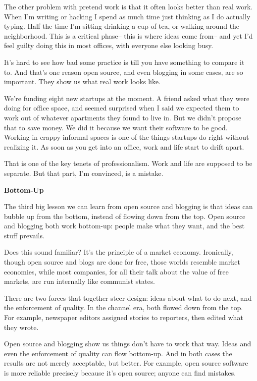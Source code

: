 The other problem with pretend work is that it often looks better than
real work. When I'm writing or hacking I spend as much time just
thinking as I do actually typing. Half the time I'm sitting drinking a
cup of tea, or walking around the neighborhood. This is a critical
phase-- this is where ideas come from-- and yet I'd feel guilty doing
this in most offices, with everyone else looking busy.

It's hard to see how bad some practice is till you have something to
compare it to. And that's one reason open source, and even blogging in
some cases, are so important. They show us what real work looks like.

We're funding eight new startups at the moment. A friend asked what they
were doing for office space, and seemed surprised when I said we
expected them to work out of whatever apartments they found to live in.
But we didn't propose that to save money. We did it because we want
their software to be good. Working in crappy informal spaces is one of
the things startups do right without realizing it. As soon as you get
into an office, work and life start to drift apart.

That is one of the key tenets of professionalism. Work and life are
supposed to be separate. But that part, I'm convinced, is a mistake.

\textbf{Bottom-Up}

The third big lesson we can learn from open source and blogging is that
ideas can bubble up from the bottom, instead of flowing down from the
top. Open source and blogging both work bottom-up: people make what they
want, and the best stuff prevails.

Does this sound familiar? It's the principle of a market economy.
Ironically, though open source and blogs are done for free, those worlds
resemble market economies, while most companies, for all their talk
about the value of free markets, are run internally like communist
states.

There are two forces that together steer design: ideas about what to do
next, and the enforcement of quality. In the channel era, both flowed
down from the top. For example, newspaper editors assigned stories to
reporters, then edited what they wrote.

Open source and blogging show us things don't have to work that way.
Ideas and even the enforcement of quality can flow bottom-up. And in
both cases the results are not merely acceptable, but better. For
example, open source software is more reliable precisely because it's
open source; anyone can find mistakes.

